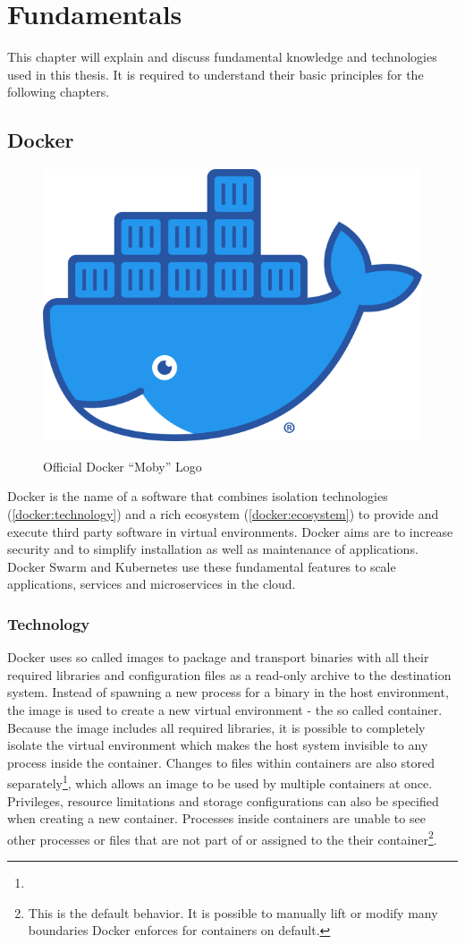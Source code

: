 \chapter{Fundamentals}

This chapter will explain and discuss fundamental knowledge and technologies used in this thesis.
It is required to understand their basic principles for the following chapters.

\section{Docker}
\label{docker:image}

\begin{figure}
	\centering
	\includegraphics[width=.2\textwidth]{res/docker-Moby-logo.png}
	\label{docker:logo}
	\caption{Official Docker \enquote{Moby} Logo\cite{docker:logo}}
	\vspace{1cm}
\end{figure}

Docker is the name of a software that combines isolation technologies (\autoref{docker:technology}) and a rich ecosystem (\autoref{docker:ecosystem}) to provide and execute third party software in virtual environments.
Docker aims are to increase security and to simplify installation as well as maintenance of applications.
Docker Swarm\cite{docker:swarm:key-concepts} and Kubernetes\cite{kubernetes:overview} use these fundamental features to scale applications, services and microservices in the cloud.


\subsection{Technology}
\label{docker:technology}

Docker uses so called images to package and transport binaries with all their required libraries and configuration files as a read-only archive to the destination system.
Instead of spawning a new process for a binary in the host environment, the image is used to create a new virtual environment - the so called container.
Because the image includes all required libraries, it is possible to completely isolate the virtual environment which makes the host system invisible to any process inside the container.
Changes to files within containers are also stored separately\footnote{}, which allows an image to be used by multiple containers at once.
Privileges, resource limitations and storage configurations can also be specified when creating a new container.
Processes inside containers are unable to see  other processes or files that are not part of or assigned to the their container\footnote{This is the default behavior. It is possible to manually lift or modify many boundaries Docker enforces for containers on default.}.


